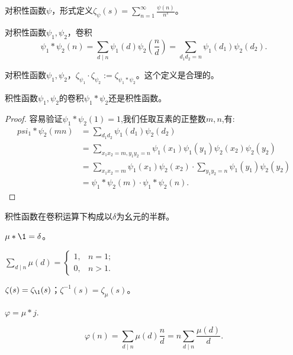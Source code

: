 \begin{definition}
    对积性函数$\psi$，形式定义$\displaystyle \zeta_\psi(s) = \sum_{n=1}^\infty \frac{\psi(n)}{n^s}$。
\end{definition}
\begin{definition}
    对积性函数$\psi_1,\psi_2$，卷积\[ \psi_1*\psi_2(n) = \sum_{d \mid n}\psi_1(d)\psi_2\left( \frac{n}{d} \right) = \sum_{d_1d_2 = n}\psi_1(d_1)\psi_2(d_2).\]
\end{definition}
\begin{definition}
对积性函数$\psi_1,\psi_2$，$\zeta_{\psi_1}\cdot\zeta_{\psi_2} := \zeta_{\psi_1*\psi_2}$。这个定义是合理的。
\end{definition}
\begin{lemma}
    积性函数$\psi_1,\psi_2$的卷积$\psi_1*\psi_2$还是积性函数。
\end{lemma}
\begin{proof}
    容易验证$\psi_1*\psi_2(1)=1$,我们任取互素的正整数$m,n$,有:
    \begin{align}
        psi_1*\psi_2(mn) &= \sum_{d_1d_2} \psi_1(d_1)\psi_2(d_2) \\
                        &= \sum_{x_1x_2 = m, y_1y_2 = n} \psi_1(x_1)\psi_1(y_1)\psi_2(x_2)\psi_2(y_2) \\
                        &= \sum_{x_1x_2 = m} \psi_1(x_1) \psi_2(x_2) \cdot \sum_{y_1y_2 = n}\psi_1(y_1) \psi_2(y_2) \\
                        &= \psi_1 *\psi_2(m) \cdot \psi_1*\psi_2(n).
    \end{align}
\end{proof}

\begin{corollary}
    积性函数在卷积运算下构成以$\delta$为幺元的半群。
\end{corollary}
\begin{proposition}
    $\mu*\1 = \delta$。
\end{proposition}
\begin{corollary}
    $\displaystyle \sum_{d \mid n}\mu(d) = \begin{cases}
        1, & n=1;\\
        0, & n>1.
    \end{cases}$
\end{corollary}
\begin{corollary}
    $\zeta(s) = \zeta_{\1}(s)$；$\zeta^{-1}(s) = \zeta_\mu(s)$。
\end{corollary}
\begin{lemma}
    $\varphi = \mu*j$.
\end{lemma}
\begin{corollary}
    \[\varphi(n) = \sum_{d \mid n}\mu(d)\frac{n}{d} = n\sum_{d \mid n}\frac{\mu(d)}{d}.\]
\end{corollary}
